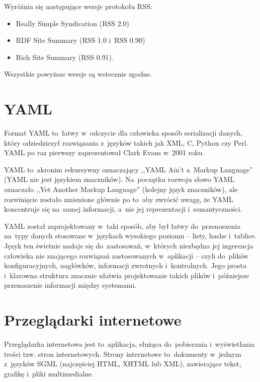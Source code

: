 \documentclass[a4paper,12pt,oneside]{report}
\begin{document}
Wyróżnia się następujące wersje protokołu RSS:
\begin{itemize}
  \item Really Simple Syndication (RSS 2.0)
  \item RDF Site Summary (RSS 1.0 i~RSS 0.90)
  \item Rich Site Summary (RSS 0.91).
\end{itemize}

Wszystkie powyższe wersje są wstecznie zgodne.

\section{YAML}
\label{sec:yaml}
Format YAML to~łatwy w~odczycie dla człowieka sposób serializacji danych, który odziedziczył rozwiązania z~języków takich jak XML, C, Python czy Perl. YAML po raz pierwszy zaprezentował Clark Evans w~2001 roku.

YAML to~akronim rekursywny oznaczający ,,YAML Ain't a~Markup Language'' (YAML nie jest językiem znaczników). Na~początku rozwoju słowo YAML oznaczało ,,Yet Another Markup Language'' (kolejny język znaczników), ale rozwinięcie zostało zmienione głównie po to~aby zwrócić uwagę, że YAML koncentruje się na~samej informacji, a~nie jej reprezentacji i~semantyczności.

YAML został zaprojektowany w~taki sposób, aby był łatwy do~przenoszenia na~typy danych stosowane w~językach wysokiego poziomu -- listy, hashe i~tablice. Język ten świetnie nadaje się do~zastosowań, w~których niezbędna jej ingerencja człowieka nie znającego rozwiązań zastosowanych w~aplikacji -- czyli do~plików konfiguracyjnych, nagłówków, informacji zwrotnych i~kontrolnych. Jego prosta i~klarowna struktura znacznie ułatwia projektowanie takich plików i~późniejsze przenoszenie informacji między systemami.

\section{Przeglądarki internetowe}
\label{sec:przegladarki}

Przeglądarka internetowa jest to~aplikacja, służąca do~pobierania i~wyświetlania treści tzw. stron internetowych. Strony internetowe to~dokumenty w~jednym z~języków SGML (najczęściej HTML, XHTML lub XML), zawierające tekst, grafikę i~pliki multimedialne.
\end{document}
